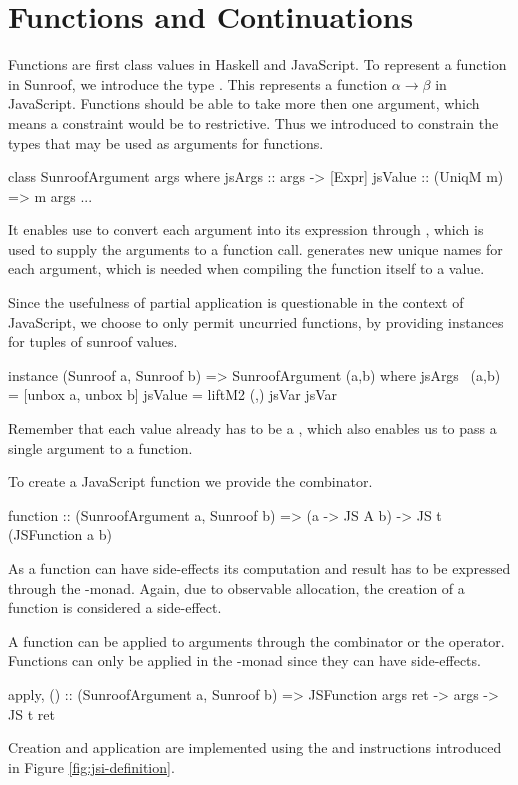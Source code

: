  
\section{Functions and Continuations}
\label{sec:functions-continuations}

Functions are first class values in Haskell and JavaScript.
To represent a function in Sunroof, we introduce the type 
. This represents a function
$\alpha \rightarrow \beta$ in JavaScript. Functions should
be able to take more then one argument, which means a 
 constraint would be to restrictive.
Thus we introduced  to constrain the 
types that may be used as arguments for functions.
\begin{Code}
class SunroofArgument args where
  jsArgs   :: args -> [Expr]
  jsValue  :: (UniqM m) => m args
  ...
\end{Code}
It enables use to convert each argument into its expression
through , which is used to supply the
arguments to a function call.  generates
new unique names for each argument, which is needed when compiling
the function itself to a value. 

Since the usefulness of partial application is questionable in
the context of JavaScript, we choose to only permit uncurried functions,
by providing instances for tuples of sunroof values.
\begin{Code}
instance (Sunroof a, Sunroof b) => SunroofArgument (a,b) where
  jsArgs ~(a,b) = [unbox a, unbox b]
  jsValue = liftM2 (,) jsVar jsVar
\end{Code}
Remember that each  value already has to be 
a , which also enables us to pass a single argument
to a function. 

To create a JavaScript function we provide the  combinator.
\begin{Code}
function :: (SunroofArgument a, Sunroof b) 
         => (a -> JS A b)  -> JS t (JSFunction a b)
\end{Code}
As a function can have side-effects its computation and result has to be 
expressed through the \JS-monad. Again, due to observable allocation,
the creation of a function is considered a side-effect.

A function can be applied to arguments through the  combinator
or the \Src{\$\$} operator.
Functions can only be applied in the \JS-monad since they can have side-effects.
\begin{Code}
apply, ($$) :: (SunroofArgument a, Sunroof b) 
            => JSFunction args ret -> args -> JS t ret
\end{Code}
Creation and application are implemented using the 
and  instructions introduced in 
Figure \ref{fig:jsi-definition}.

